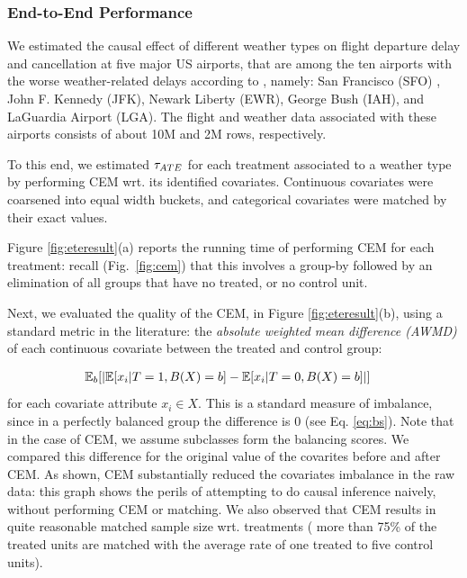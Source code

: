 \vspace{-.2cm}


\subsubsection{End-to-End Performance} \label{sec:endtoend}

We estimated the causal effect of different weather types on flight departure delay and cancellation at five major US airports, that are among the ten airports with the worse weather-related delays according to \cite{weather},  namely: San Francisco (SFO) , John F. Kennedy (JFK), Newark Liberty (EWR), George Bush (IAH), and LaGuardia Airport (LGA).  The
flight and weather data associated with these airports consists of about 10M and 2M rows, respectively.

To this end, we estimated ${\tau_{ATE}}$  for each treatment associated to a weather type by performing CEM wrt. its identified covariates.  Continuous covariates were coarsened into equal width buckets, and categorical covariates were
matched by their exact values.

Figure \ref{fig:eteresult}(a) reports the running time of performing
CEM for each treatment: recall (Fig.~\ref{fig:cem}) that this involves
a group-by followed by an elimination of all groups that have no
treated, or no control unit.
 Next, we evaluated the quality of the CEM, in Figure
\ref{fig:eteresult}(b), using a standard metric in the literature: the
{\em absolute weighted mean difference (AWMD)} of each continuous
covariate between the treated and control group:

\vspace{-.5cm}
{\small
\begin{align}
& \mathbb{E}_b[|\mathbb{E}[x_i | T=1, B(X)=b]-\mathbb{E}[x_i | T=0, B(X)=b]|] \label{eq:awmd}
\end{align}
}\noindent for each covariate attribute $x_i \in X$.  This is
a standard measure of imbalance, since in a perfectly balanced group
the difference is 0 (see Eq. \ref{eq:bs}). Note that in the case of CEM, we assume subclasses form the balancing scores.  We compared this
difference for the original value of the covarites  before and after CEM.  As shown, CEM substantially reduced
the covariates imbalance in the raw data: this graph shows the perils
of attempting to do causal inference naively, without performing CEM
or matching.  We also observed that CEM results in quite reasonable
matched sample size wrt. treatments ( more than 75\% of the treated
units are matched with the average rate of one treated to five control
units).


